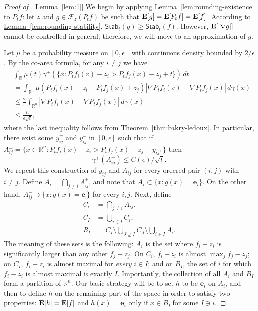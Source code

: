 \documentclass[11pt]{article}
\numberwithin{equation}{section}
\theoremstyle{definition}
\theoremstyle{plain}
\newcommand{\R}{\mathbb R}
\newcommand{\expref}[2]{\hyperref[#2]{#1~\ref{#2}}}
\newcommand{\E}{{\bf E}}
\newcommand{\calF}{\mathcal{F}}
\newcommand{\Stab}{\mathsf{Stab}}
\begin{document}
\begin{proof}[Proof of \expref{Lemma}{lem:1}]
We begin by applying \expref{Lemma}{lem:rounding-existence} to $P_t f$: let $z$ and $g \in \calF_z(P_t f)$
be such that $\E[g] = \E[P_t f] = \E[f]$. According to \expref{Lemma}{lem:rounding-stability}, $\Stab_t(g) \ge \Stab_t(f)$.
However, $\E[|\nabla g|]$ cannot be controlled in general; therefore, we will move to an approximation of $g$.

Let $\mu$ be a probability measure on $[0, \epsilon]$ with continuous density bounded by $2/\epsilon$.
By the co-area formula, for any $i \ne j$ we have
\begin{align*}
  &\int_\R \mu(t) \gamma^+(\{x: P_t f_i(x) - z_i > P_t f_j(x) - z_j + t\})\, dt \\
  &= \int_{\R^n} \mu(P_t f_i(x) - z_i - P_t f_j(x) + z_j) |\nabla P_t f_i(x) - \nabla P_t f_j(x)|\, d\gamma(x) \\
  &\le \frac{2}{\epsilon} \int_{\R^n} |\nabla P_t f_i(x) - \nabla P_t f_j(x)|\, d\gamma(x) \\
  &\le \frac{C}{\epsilon \sqrt t},
\end{align*}
where the last inequality follows from \expref{Theorem}{thm:bakry-ledoux}.
In particular, there exist some $y_{ij}^+$ and $y_{ij}^-$ in $[0, \epsilon]$ such that if
$A_{ij}^{\pm} = \{x \in \R^n: P_t f_i(x) - z_i > P_t f_j(x) - z_j \pm y_{ij^{\pm}}\}$ then
\[
\gamma^+(A_{ij}^\pm) \le C(\epsilon)/\sqrt t.
\]
We repeat this construction of $y_{ij}$ and $A_{ij}$ for every ordered pair $(i, j)$ with $i \ne j$.
Define $A_i = \bigcap_{j \ne i} A_{ij}^+$, and note that $A_i \subset \{x: g(x) = \mathbf{e}_i\}$.
On the other hand, $A_{ij}^- \supset \{x: g(x) = \mathbf{e}_i\}$ for every $i, j$.
Next, define
\begin{align*}
  C_i &= \bigcap_{j \ne i} A_{ij}^-, \\
  C_I &= \bigcup_{i \in I} C_i, \\
  B_I &= C_I \setminus \bigcup_{J \supsetneq I} C_J \setminus \bigcup_{i \in I} A_i.
\end{align*}
The meaning of these sets is the following: $A_i$ is the set where $f_i - z_i$ is significantly larger than
any other
$f_j - z_j$. On $C_i$, $f_i - z_i$ is almost $\max_j f_j - z_j$;
on $C_I$, $f_i - z_i$ is almost maximal for \emph{every} $i \in I$; and on $B_I$, the set
of $i$ for which $f_i - z_i$ is almost maximal is exactly $I$. Importantly, the collection
of all $A_i$ and $B_I$ form a partition of $\R^n$. Our basic strategy will be to set $h$ to be $\mathbf{e}_i$
on $A_i$, and then to define $h$ on the remaining part of the space in order to satisfy two properties:
$\E[h] = \E[f]$ and $h(x) = \mathbf{e}_i$ only if $x \in B_I$ for some $I \ni i$.


\end{proof}
\end{document}
